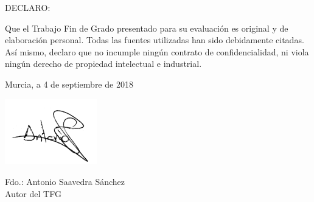 DECLARO:

Que el Trabajo Fin de Grado presentado para su evaluación es original y de elaboración personal. Todas las fuentes utilizadas han sido debidamente citadas. Así mismo, declaro que no incumple ningún contrato de confidencialidad, ni viola ningún derecho de propiedad intelectual e industrial.

\begin{center}
    Murcia, a 4 de septiembre de 2018

    \includegraphics[width=0.3\textwidth]{./images/firma}

    Fdo.: Antonio Saavedra Sánchez \\
    Autor del TFG

\end{center}





\newpage
